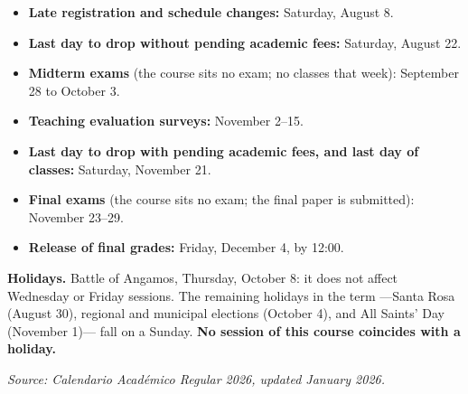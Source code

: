 \documentclass[11pt]{article}
\begin{document}
\begin{itemize}
\item \textbf{Late registration and schedule changes:} Saturday, August 8.
\item \textbf{Last day to drop without pending academic fees:} Saturday, August 22.
\item \textbf{Midterm exams} (the course sits no exam; no classes that week): September 28 to October 3.
\item \textbf{Teaching evaluation surveys:} November 2--15.
\item \textbf{Last day to drop with pending academic fees, and last day of classes:} Saturday, November 21.
\item \textbf{Final exams} (the course sits no exam; the final paper is submitted): November 23--29.
\item \textbf{Release of final grades:} Friday, December 4, by 12:00.
\end{itemize}

\textbf{Holidays.} Battle of Angamos, Thursday, October 8: it does not affect Wednesday or Friday sessions. The remaining holidays in the term ---Santa Rosa (August 30), regional and municipal elections (October 4), and All Saints' Day (November 1)--- fall on a Sunday. \textbf{No session of this course coincides with a holiday.}

\emph{Source: Calendario Acad\'emico Regular 2026, updated January 2026.}
\end{document}
